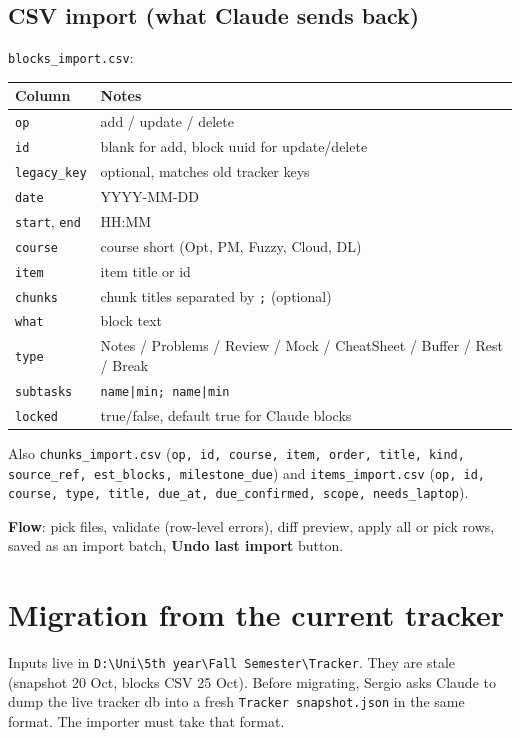 \documentclass[11pt,a4paper]{article}
\newcommand{\code}[1]{\texttt{\small #1}}
\begin{document}
\subsection{CSV import (what Claude sends back)}
\code{blocks\_import.csv}:

\begin{longtable}{L{3cm}L{12.5cm}}
\toprule
\textbf{Column} & \textbf{Notes} \\
\midrule
\endhead
\code{op} & add / update / delete \\
\code{id} & blank for add, block uuid for update/delete \\
\code{legacy\_key} & optional, matches old tracker keys \\
\code{date} & YYYY-MM-DD \\
\code{start}, \code{end} & HH:MM \\
\code{course} & course short (Opt, PM, Fuzzy, Cloud, DL) \\
\code{item} & item title or id \\
\code{chunks} & chunk titles separated by \code{;} (optional) \\
\code{what} & block text \\
\code{type} & Notes / Problems / Review / Mock / CheatSheet / Buffer / Rest / Break \\
\code{subtasks} & \code{name|min; name|min} \\
\code{locked} & true/false, default true for Claude blocks \\
\bottomrule
\end{longtable}

Also \code{chunks\_import.csv} (\code{op, id, course, item, order, title, kind, source\_ref, est\_blocks, milestone\_due}) and \code{items\_import.csv} (\code{op, id, course, type, title, due\_at, due\_confirmed, scope, needs\_laptop}).

\textbf{Flow}: pick files, validate (row-level errors), diff preview, apply all or pick rows, saved as an import batch, \textbf{Undo last import} button.

\section{Migration from the current tracker}

Inputs live in \code{D:\textbackslash Uni\textbackslash 5th year\textbackslash Fall Semester\textbackslash Tracker}. They are stale (snapshot 20 Oct, blocks CSV 25 Oct). Before migrating, Sergio asks Claude to dump the live tracker db into a fresh \code{Tracker snapshot.json} in the same format. The importer must take that format.
\end{document}
